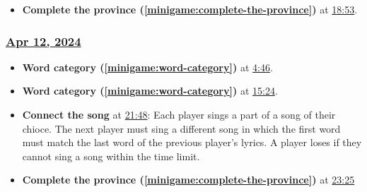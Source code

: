 \documentclass{article}
\begin{document}
\begin{itemize}
    \item \textbf{Complete the province (\ref{minigame:complete-the-province})} at \href{https://youtu.be/2twXtyOaeb4?t=1133}{18:53}.
\end{itemize}

\subsubsection{\href{https://youtu.be/0cOJWnshdgI}{Apr 12, 2024}}

\begin{itemize}
    \item \textbf{Word category (\ref{minigame:word-category})} at \href{https://youtu.be/0cOJWnshdgI?t=286}{4:46}.
    \item \textbf{Word category (\ref{minigame:word-category})} at \href{https://youtu.be/0cOJWnshdgI?t=924}{15:24}.
    \item \textbf{Connect the song} at \href{https://youtu.be/0cOJWnshdgI?t=1308}{21:48}: Each player sings a part of a song of their chioce. The next player must sing a different song in which the first word must match the last word of the previous player's lyrics. A player loses if they cannot sing a song within the time limit. \label{mingame:connect-the-song}
    \item \textbf{Complete the province (\ref{minigame:complete-the-province})} at \href{https://youtu.be/0cOJWnshdgI?t=1405}{23:25}
\end{itemize}
\end{document}
